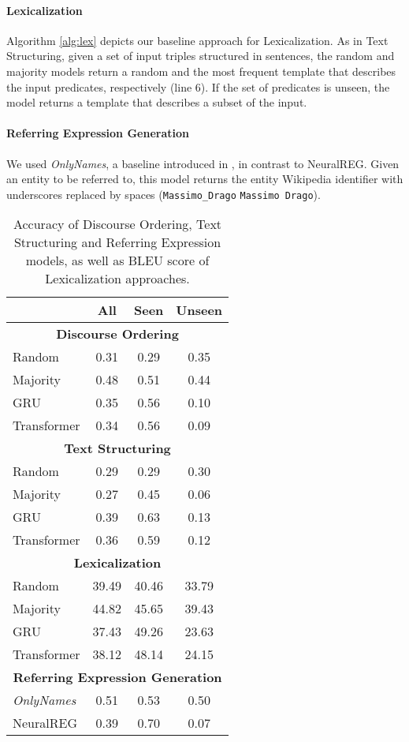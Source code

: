 \documentclass[11pt,a4paper]{article}
\begin{document}
\paragraph{Lexicalization} Algorithm \ref{alg:lex} depicts our baseline approach for Lexicalization. As in Text Structuring, given a set of input triples structured in sentences, the random and majority models return a random and the most frequent template that describes the input predicates, respectively (line 6). If the set of predicates is unseen, the model returns a template that describes a subset of the input.

\paragraph{Referring Expression Generation} We used \textit{OnlyNames}, a baseline introduced in \citet{ferreira2018}, in contrast to NeuralREG. Given an entity to be referred to, this model returns the entity Wikipedia identifier with underscores replaced by spaces (\texttt{Massimo\_Drago}  \texttt{Massimo Drago}).

\begin{table}
\centering
\footnotesize{
\begin{tabular}{l c c c}
\toprule
                         & \textbf{All} & \textbf{Seen} & \textbf{Unseen} \\
\midrule
\multicolumn{4}{c}{\bf Discourse Ordering}\\
\midrule
Random      & 0.31 & 0.29 & 0.35 \\
Majority    & 0.48 & 0.51 & 0.44 \\
GRU         & 0.35 & 0.56 & 0.10 \\
Transformer & 0.34 & 0.56 & 0.09 \\
\midrule
\multicolumn{4}{c}{\bf Text Structuring}\\
\midrule
Random      & 0.29 & 0.29 & 0.30 \\
Majority    & 0.27 & 0.45 & 0.06 \\
GRU         & 0.39 & 0.63 & 0.13 \\
Transformer & 0.36 & 0.59 & 0.12 \\
\midrule
\multicolumn{4}{c}{\bf Lexicalization}\\
\midrule
Random      & 39.49 & 40.46 & 33.79 \\
Majority    & 44.82 & 45.65 & 39.43 \\
GRU         & 37.43 & 49.26 & 23.63 \\
Transformer & 38.12 & 48.14 & 24.15 \\
\midrule
\multicolumn{4}{c}{\bf Referring Expression Generation}\\
\midrule
\textit{OnlyNames} & 0.51 & 0.53 & 0.50 \\
NeuralREG          & 0.39 & 0.70 & 0.07 \\
\bottomrule
\end{tabular}
}
\caption{Accuracy of Discourse Ordering, Text Structuring and Referring Expression models, as well as BLEU score of Lexicalization approaches.}
\label{table:results1}
\end{table}
\end{document}
